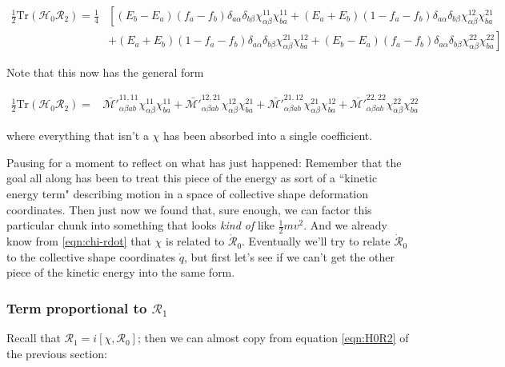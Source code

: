 \begin{align}
\frac{1}{2}\mathrm{Tr}\left(\mathcal{H}_0\mathcal{R}_2\right) = \frac{1}{4}
& \left[(E_b-E_a)(f_a-f_b)\delta_{a\alpha}\delta_{b\beta}\chi^{11}_{\alpha\beta}\chi^{11}_{ba} + (E_a+E_b)(1-f_a-f_b)\delta_{a\alpha}\delta_{b\beta}\chi^{12}_{\alpha\beta}\chi^{21}_{ba}\right. \\
&\left.+ (E_a+E_b)(1-f_a-f_b)\delta_{a\alpha}\delta_{b\beta}\chi^{21}_{\alpha\beta}\chi^{12}_{ba} + (E_b-E_a)(f_a-f_b)\delta_{a\alpha}\delta_{b\beta}\chi^{22}_{\alpha\beta}\chi^{22}_{ba}\right]
\end{align}

\noindent Note that this now has the general form

\begin{tcolorbox}
	\begin{align}\label{eqn:H0R2_inertia}
	\frac{1}{2}\mathrm{Tr}\left(\mathcal{H}_0\mathcal{R}_2\right) = &
	\mathcal{\bar{M'}}^{11,11}_{\alpha\beta ab}\chi^{11}_{\alpha\beta}\chi^{11}_{ba} +
	\mathcal{\bar{M'}}^{12,21}_{\alpha\beta ab}\chi^{12}_{\alpha\beta}\chi^{21}_{ba} +
	\mathcal{\bar{M'}}^{21,12}_{\alpha\beta ab}\chi^{21}_{\alpha\beta}\chi^{12}_{ba} +
	\mathcal{\bar{M'}}^{22,22}_{\alpha\beta ab}\chi^{22}_{\alpha\beta}\chi^{22}_{ba}
	\end{align}
\end{tcolorbox}

\noindent where everything that isn't a $\chi$ has been absorbed into a single coefficient.

Pausing for a moment to reflect on what has just happened: Remember that the goal all along has been to treat this piece of the energy as sort of a ``kinetic energy term" describing motion in a space of collective shape deformation coordinates. Then just now we found that, sure enough, we can factor this particular chunk into something that looks \textit{kind of} like $\frac{1}{2}mv^2$. And we already know from \eqref{eqn:chi-rdot} that $\chi$ is related to $\mathcal{\dot{R}}_0$. Eventually we'll try to relate $\mathcal{\dot{R}}_0$ to the collective shape coordinates $\dot{q}$, but first let's see if we can't get the other piece of the kinetic energy into the same form.

\subsubsection{Term proportional to $\mathcal{R}_1$}

Recall that $\mathcal{R}_1 = i\left[\chi, \mathcal{R}_0\right]$; then we can almost copy from equation \eqref{eqn:H0R2} of the previous section:

